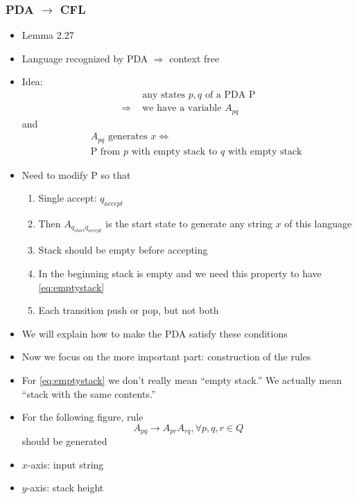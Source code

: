 





\begin{frame}[allowframebreaks]
  \frametitle{PDA $\rightarrow$ CFL}
  \begin{itemize}
\item Lemma 2.27
\item Language recognized by PDA
$\Rightarrow$ context free
\item Idea:
  \begin{equation*}
    \begin{split}
& \text{ any states } p,q \text{ of a PDA P} \\
\Rightarrow & \text{ we have a variable } A_{pq}
\end{split}
\end{equation*}
and
\begin{eqnarray}
&& \mbox{$A_{pq}$ generates $x
\Leftrightarrow$}  \label{eq:emptystack} \\ 
&& \mbox{P from $p$ with empty
stack to $q$ with empty stack}
\nonumber
\end{eqnarray}
\item Need to modify P so that

  \begin{enumerate}
  \item Single accept: $q_{accept}$

  \item [] Then  $A_{q_{start} q_{accept}}$
    is the start state to generate any string $x$
    of this language
  \item Stack should be empty before accepting
  \item [] In the beginning stack is empty and we need this property to
    have \eqref{eq:emptystack}
  \item Each transition push or pop, but not both
  \end{enumerate}

\item We will explain how to make the PDA satisfy these conditions

\item Now we focus on the more important part: construction of the rules

\item For \eqref{eq:emptystack} we don't really mean
  ``empty stack.'' We actually mean ``stack with the same
  contents.''
\item For the following figure, rule
  \begin{equation*}
    A_{pq} \rightarrow A_{pr} A_{rq}, \forall p, q, r \in Q
  \end{equation*}
should be generated
\item $x$-axis: input string
\item [] $y$-axis: stack height
  

\end{itemize}
\end{frame}

